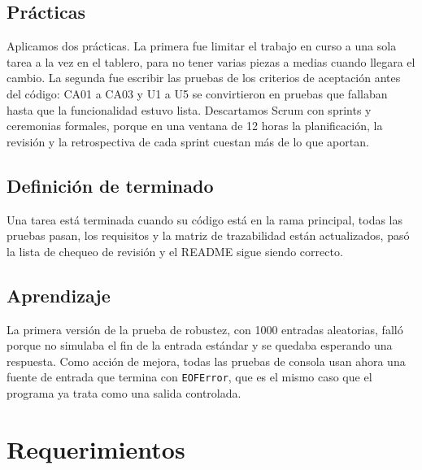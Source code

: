 \documentclass[11pt,letterpaper]{article}
\newcommand{\cod}[1]{\texttt{#1}}
\begin{document}
\subsection{Prácticas}
Aplicamos dos prácticas. La primera fue limitar el trabajo en curso a una sola tarea a la vez en el tablero, para no tener varias piezas a medias cuando llegara el cambio. La segunda fue escribir las pruebas de los criterios de aceptación antes del código: CA01 a CA03 y U1 a U5 se convirtieron en pruebas que fallaban hasta que la funcionalidad estuvo lista. Descartamos Scrum con sprints y ceremonias formales, porque en una ventana de 12 horas la planificación, la revisión y la retrospectiva de cada sprint cuestan más de lo que aportan.

\subsection{Definición de terminado}
Una tarea está terminada cuando su código está en la rama principal, todas las pruebas pasan, los requisitos y la matriz de trazabilidad están actualizados, pasó la lista de chequeo de revisión y el README sigue siendo correcto.

\subsection{Aprendizaje}
La primera versión de la prueba de robustez, con 1000 entradas aleatorias, falló porque no simulaba el fin de la entrada estándar y se quedaba esperando una respuesta. Como acción de mejora, todas las pruebas de consola usan ahora una fuente de entrada que termina con \cod{EOFError}, que es el mismo caso que el programa ya trata como una salida controlada.

\section{Requerimientos}\label{sec:req}
\end{document}
